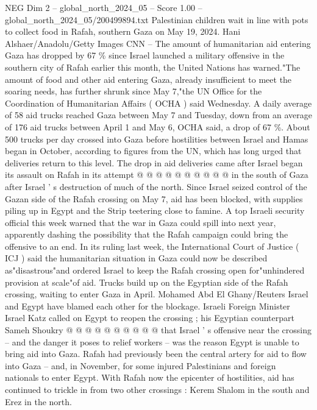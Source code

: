 \begin{textsample}{NEG Dim 2 – global\_north\_2024\_05 – Score 1.00 – global\_north\_2024\_05/200499894.txt}  \label{ex:f2_neg_056}
Palestinian children wait in line with pots to collect food in Rafah, southern Gaza on May 19, 2024.
Hani Alshaer/Anadolu/Getty Images CNN -- The amount of humanitarian aid entering Gaza has dropped by 67 \% since Israel launched a military offensive in the southern city of Rafah earlier this month, the United Nations has warned."The amount of food and other aid entering Gaza, already insufficient to meet the soaring needs, has further shrunk since May 7,"the UN Office for the Coordination of Humanitarian Affairs ( OCHA ) said Wednesday.
A daily average of 58 aid trucks reached Gaza between May 7 and Tuesday, down from an average of 176 aid trucks between April 1 and May 6, OCHA said, a drop of 67 \%.
About 500 trucks per day crossed into Gaza before hostilities between Israel and Hamas began in October, according to figures from the UN, which has long urged that deliveries return to this level.
The drop in aid deliveries came after Israel began its assault on Rafah in its attempt @ @ @ @ @ @ @ @ @ @ in the south of Gaza after Israel ' s destruction of much of the north.
Since Israel seized control of the Gazan side of the Rafah crossing on May 7, aid has been blocked, with supplies piling up in Egypt and the Strip teetering close to famine.
A top Israeli security official this week warned that the war in Gaza could spill into next year, apparently dashing the possibility that the Rafah campaign could bring the offensive to an end.
In its ruling last week, the International Court of Justice ( ICJ ) said the humanitarian situation in Gaza could now be described as"disastrous"and ordered Israel to keep the Rafah crossing open for"unhindered provision at scale"of aid.
Trucks build up on the Egyptian side of the Rafah crossing, waiting to enter Gaza in April.
Mohamed Abd El Ghany/Reuters Israel and Egypt have blamed each other for the blockage.
Israeli Foreign Minister Israel Katz called on Egypt to reopen the crossing ; his Egyptian counterpart Sameh Shoukry @ @ @ @ @ @ @ @ @ @ that Israel ' s offensive near the crossing -- and the danger it poses to relief workers -- was the reason Egypt is unable to bring aid into Gaza.
Rafah had previously been the central artery for aid to flow into Gaza -- and, in November, for some injured Palestinians and foreign nationals to enter Egypt.
With Rafah now the epicenter of hostilities, aid has continued to trickle in from two other crossings : Kerem Shalom in the south and Erez in the north.

\end{textsample}
